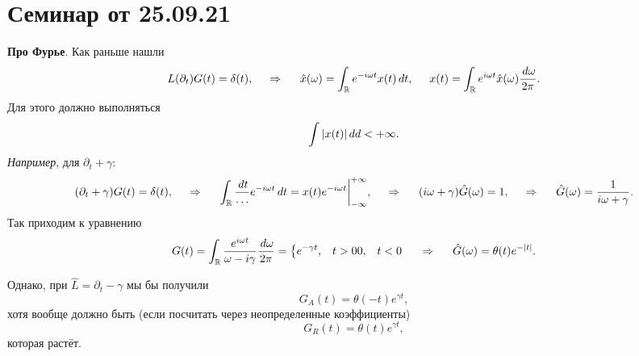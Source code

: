 \section{Семинар от 25.09.21}

\textbf{Про Фурье}. 
Как раньше нашли
\begin{equation*}
    L(\partial_t) G(t) = \delta(t),
    \hspace{0.5cm} \Rightarrow \hspace{0.5cm}
    \hat{x} (\omega) = \int_{\mathbb{R}} e^{- i \omega t} x(t) \, d t,
    \hspace{5 mm} 
    x(t) = \int_{\mathbb{R}} e^{i \omega t} \hat{x}(\omega) \frac{\, d \omega}{2\pi}.
\end{equation*}
Для этого должно выполняться
\begin{equation*}
    \int |x(t)| \, d d < + \infty.
\end{equation*}
\textit{Например}, для $\partial_t + \gamma$:
\begin{equation*}
    (\partial_t + \gamma) G(t) = \delta(t),
    \hspace{0.5cm} \Rightarrow \hspace{0.5cm}
    \int_{\mathbb{R}} \frac{\, d t}{\ldots} e^{- i \omega t} \, d t = x(t) e^{- i \omega t} \bigg|_{-\infty}^{+\infty},
    \hspace{0.5cm} \Rightarrow \hspace{0.5cm}
    (i \omega + \gamma) \hat{G} (\omega) = 1,
    \hspace{0.5cm} \Rightarrow \hspace{0.5cm}
    \hat{G}(\omega) = \frac{1}{i \omega + \gamma}.
\end{equation*}
Так приходим к уравнению
\begin{equation*}
    G(t) = \int_{\mathbb{R}} \frac{e^{i \omega t}}{\omega - i \gamma} \frac{\, d \omega}{2\pi} = 
    \left\{\begin{aligned}
        &e^{- \gamma t}, &t > 0
        &0, &t<0
    \end{aligned}\right.
    \hspace{0.5cm} \Rightarrow \hspace{0.5cm}
    \hat{G}(\omega) = \theta(t) e^{- |t|}.
\end{equation*}

Однако, при $\hat{L} = \partial_t - \gamma$ мы бы получили
\begin{equation*}
    G_A (t) = \theta(-t) e^{\gamma t}, 
\end{equation*}
хотя вообще должно быть (если посчитать через неопределенные коэффициенты)
\begin{equation*}
    G_R (t) = \theta(t) e^{\gamma t},
\end{equation*}
которая растёт.


